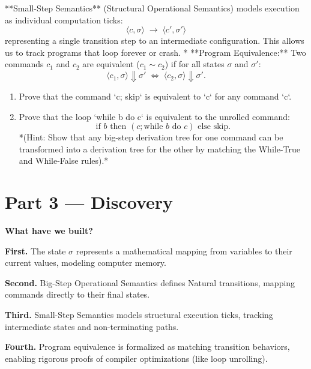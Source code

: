 \documentclass[12pt, a4paper]{book}
\begin{document}
\begin{explobox}
**Small-Step Semantics** (Structural Operational Semantics) models execution as individual computation ticks:
\[
  \langle c, \sigma \rangle \;\to\; \langle c', \sigma' \rangle
\]
representing a single transition step to an intermediate configuration.
This allows us to track programs that loop forever or crash.
* **Program Equivalence:** Two commands $c_1$ and $c_2$ are equivalent ($c_1 \sim c_2$) if for all states $\sigma$ and $\sigma'$:
  \[
    \langle c_1, \sigma \rangle \Downarrow \sigma' \;\iff\; \langle c_2, \sigma \rangle \Downarrow \sigma'.
  \]
\begin{enumerate}[label=(\alph*), leftmargin=*]
  \item Prove that the command `c; skip` is equivalent to `c` for any command `c`.
  \item Prove that the loop `while b do c` is equivalent to the unrolled command:
        \[
          \text{if } b \text{ then } (c ; \text{while } b \text{ do } c) \text{ else skip}.
        \]
        *(Hint: Show that any big-step derivation tree for one command can be transformed into a derivation tree for the other by matching the While-True and While-False rules).*
\end{enumerate}
\end{explobox}

\newpage

\section{Part 3 --- Discovery}

\begin{discoverybox}
\textbf{What have we built?}

\textbf{First.} The state $\sigma$ represents a mathematical mapping from variables to their current values, modeling computer memory.

\textbf{Second.} Big-Step Operational Semantics defines Natural transitions, mapping commands directly to their final states.

\textbf{Third.} Small-Step Semantics models structural execution ticks, tracking intermediate states and non-terminating paths.

\textbf{Fourth.} Program equivalence is formalized as matching transition behaviors, enabling rigorous proofs of compiler optimizations (like loop unrolling).
\end{discoverybox}
\end{document}
